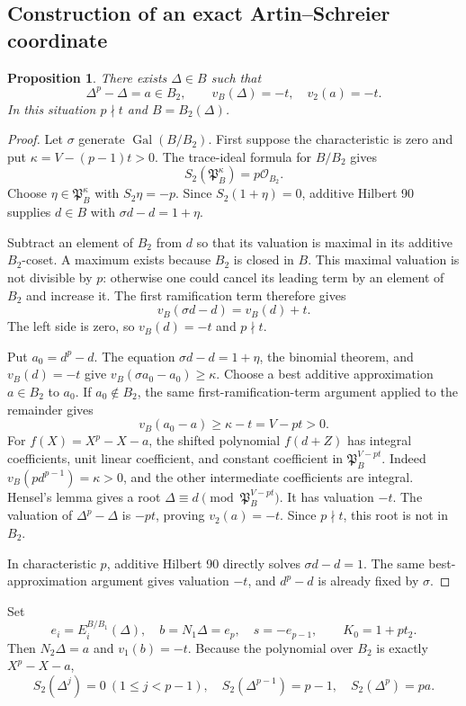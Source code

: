 \documentclass[11pt]{amsart}
\newtheorem{proposition}[theorem]{Proposition}
\theoremstyle{definition}
\theoremstyle{remark}
\newcommand{\OO}{\mathcal O}\newcommand{\pp}{\mathfrak p}\newcommand{\PP}{\mathfrak P}
\begin{document}
\subsection{Construction of an exact Artin--Schreier coordinate}
\begin{proposition}\label{O:A:prop:AS}
There exists $\Delta\in B$ such that
\[
 \Delta^p-\Delta=a\in B_2,\qquad v_B(\Delta)=-t,
 \quad v_2(a)=-t.
\]
In this situation $p\nmid t$ and $B=B_2(\Delta)$.
\end{proposition}
\begin{proof}
Let $\sigma$ generate $\operatorname{Gal}(B/B_2)$.  First suppose the
characteristic is zero and put $\kappa=V-(p-1)t>0$.  The trace-ideal formula
for $B/B_2$ gives
\[
 S_2(\PP_B^\kappa)=p\OO_{B_2}.
\]
Choose $\eta\in\PP_B^\kappa$ with $S_2\eta=-p$.
Since $S_2(1+\eta)=0$, additive Hilbert 90 supplies $d\in B$ with
$\sigma d-d=1+\eta$.

Subtract an element of $B_2$ from $d$ so that its valuation is maximal in
its additive $B_2$-coset.  A maximum exists because $B_2$ is closed in $B$.
This maximal valuation is not divisible by $p$: otherwise one could cancel
its leading term by an element of $B_2$ and increase it.  The first
ramification term therefore gives
\[
 v_B(\sigma d-d)=v_B(d)+t.
\]
The left side is zero, so $v_B(d)=-t$ and $p\nmid t$.

Put $a_0=d^p-d$.  The equation $\sigma d-d=1+\eta$, the binomial theorem,
and $v_B(d)=-t$ give
$v_B(\sigma a_0-a_0)\ge\kappa$.
Choose a best additive approximation $a\in B_2$ to $a_0$.
If $a_0\notin B_2$, the same first-ramification-term argument applied to
the remainder gives
\[
 v_B(a_0-a)\ge\kappa-t=V-pt>0.
\]
For $f(X)=X^p-X-a$, the shifted polynomial $f(d+Z)$ has integral
coefficients, unit linear coefficient, and constant coefficient in
$\PP_B^{V-pt}$.  Indeed
$v_B(p d^{p-1})=\kappa>0$, and the other intermediate coefficients are
integral.  Hensel's lemma gives a root
$\Delta\equiv d\pmod{\PP_B^{V-pt}}$.  It has valuation $-t$.
The valuation of $\Delta^p-\Delta$ is $-pt$, proving $v_2(a)=-t$.
Since $p\nmid t$, this root is not in $B_2$.

In characteristic $p$, additive Hilbert 90 directly solves
$\sigma d-d=1$.  The same best-approximation argument gives valuation $-t$,
and $d^p-d$ is already fixed by $\sigma$.
\end{proof}

Set
\[
 e_i=E_i^{B/B_1}(\Delta),\quad b=N_1\Delta=e_p,
 \quad s=-e_{p-1},\qquad K_0=1+pt_2.
\]
Then $N_2\Delta=a$ and $v_1(b)=-t$.
Because the polynomial over $B_2$ is exactly $X^p-X-a$,
\begin{equation}
 S_2(\Delta^j)=0\ (1\le j<p-1),\quad
 S_2(\Delta^{p-1})=p-1,\quad S_2(\Delta^p)=pa.
 \label{O:A:eq:moments}
\end{equation}
\end{document}
